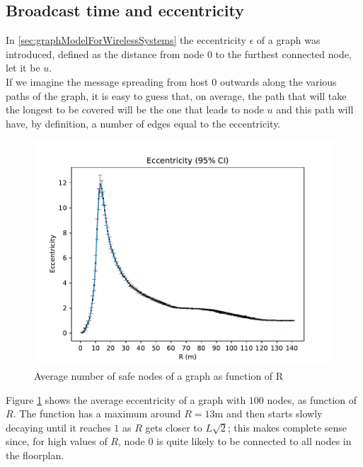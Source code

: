 \subsection{Broadcast time and eccentricity}\label{ssec:durationVsEccentricity}
In \ref{sec:graphModelForWirelessSystems} the eccentricity $\epsilon$ of a
graph was introduced, defined as the distance from node 0 to the furthest
connected node, let it be $u$.\\
If we imagine the message spreading from host 0 outwards along the various
paths of the graph, it is easy to guess that, on average, the path that will
take the longest to be covered will be the one that leads to node $u$ and this
path will have, by definition, a number of edges equal to the eccentricity.\\
\begin{figure}[H]
    \begin{center}
        \includegraphics[scale=.6]{img/graphAnalysisEccentricity.pdf}
    \end{center}
    \vspace*{-0.5cm}
    \caption{Average number of safe nodes of a graph as function of R}
    \label{fig:eccentricityFull}
\end{figure}
\noindent
Figure \ref{fig:eccentricityFull} shows the average eccentricity of a graph
with $100$ nodes, as function of $R$. The function has a maximum around
$R = 13$m and then starts slowly decaying until it reaches $1$ as $R$ gets
closer to $L\sqrt{2}$; this makes complete sense since, for high values of $R$,
node $0$ is quite likely to be connected to all nodes in the floorplan.\\
